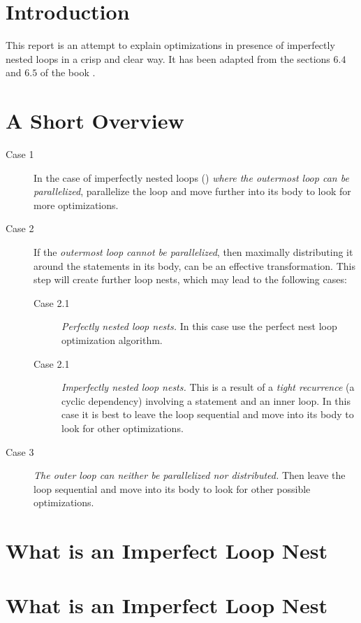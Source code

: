 \section{Introduction}
This report is an attempt to explain optimizations in presence of imperfectly nested loops in a crisp and clear way. It has been adapted from the sections $6.4$ and $6.5$ of the book .

\section{A Short Overview}
\begin{description}
    \item[Case 1] In the case of imperfectly nested loops () \emph{where the outermost loop can be parallelized}, parallelize the loop and move further into its body to look for more optimizations.
    \item[Case 2] If the \emph{outermost loop cannot be parallelized}, then maximally distributing it around the statements in its body, can be an effective transformation. This step will create further loop nests, which may lead to the following cases:
        \begin{description}
        \item[Case 2.1] \emph{Perfectly nested loop nests.} In this case use the perfect nest loop optimization algorithm.
        \item[Case 2.1] \emph{Imperfectly nested loop nests.} This is a result of a \emph{tight recurrence} (a cyclic dependency) involving a statement and an inner loop. In this case it is best to leave the loop sequential and move into its body to look for other optimizations.
        \end{description}
    \item[Case 3] \emph{The outer loop can neither be parallelized nor distributed.} Then leave the loop sequential and move into its body to look for other possible optimizations.

\end{description}

\section{What is an Imperfect Loop Nest}\label{sec:imperfectloops}

\section{What is an Imperfect Loop Nest}

